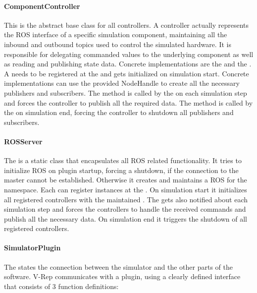 \paragraph{ComponentController}

This is the abstract base class for all controllers. A controller actually represents the ROS interface of a specific simulation component, maintaining all the inbound and outbound topics used to control the simulated hardware. It is responsible for delegating commanded values to the underlying component as well as reading and publishing state data. Concrete implementations are the  and the . A  needs to be registered at the  and gets initialized on simulation start. Concrete implementations can use the provided NodeHandle to create all the necessary publishers and subscribers. The  method is called by the  on each simulation step and forces the controller to publish all the required data. The  method is called by the  on simulation end, forcing the controller to shutdown all publishers and subscribers.
  
\paragraph{ROSServer}

The  is a static class that encapsulates all ROS related functionality. It tries to initialize ROS on plugin startup, forcing a shutdown, if the connection to the master cannot be established. Otherwise it creates and maintains a ROS  for the  namespace. Each  can register  instances at the . On simulation start it initializes all registered controllers with the maintained . The  gets also notified about each simulation step and forces the controllers to handle the received commands and publish all the necessary data. On simulation end it triggers the shutdown of all registered controllers.

\paragraph{SimulatorPlugin}

The  states the connection between the simulator and the other parts of the software. V-Rep communicates with a plugin, using a clearly defined interface that consists of 3 function definitions:

